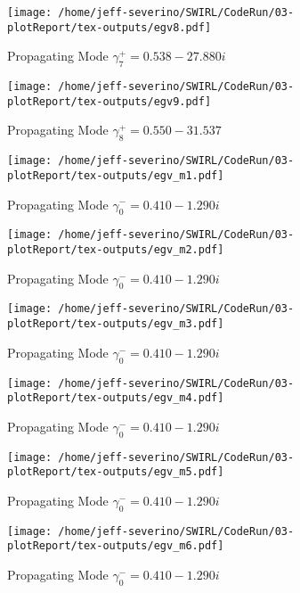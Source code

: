 \documentclass{article}
\begin{document}
 \begin{figure}
     \centering
     \texttt{[image: /home/jeff-severino/SWIRL/CodeRun/03-plotReport/tex-outputs/egv8.pdf]}
     \caption{Propagating Mode $\gamma^+_7 = 0.538 - 27.880i$}
 \end{figure}


 \begin{figure}
     \centering
     \texttt{[image: /home/jeff-severino/SWIRL/CodeRun/03-plotReport/tex-outputs/egv9.pdf]}
     \caption{Propagating Mode $\gamma^+_8 = 0.550 - 31.537$}
 \end{figure}




 \begin{figure}
     \centering
     \texttt{[image: /home/jeff-severino/SWIRL/CodeRun/03-plotReport/tex-outputs/egv\_m1.pdf]}
     \caption{Propagating Mode $\gamma^-_0 = 0.410-1.290i$}
 \end{figure}


 \begin{figure}
     \centering
     \texttt{[image: /home/jeff-severino/SWIRL/CodeRun/03-plotReport/tex-outputs/egv\_m2.pdf]}
     \caption{Propagating Mode $\gamma^-_0 = 0.410-1.290i$}
 \end{figure}


 \begin{figure}
     \centering
     \texttt{[image: /home/jeff-severino/SWIRL/CodeRun/03-plotReport/tex-outputs/egv\_m3.pdf]}
     \caption{Propagating Mode $\gamma^-_0 = 0.410-1.290i$}
 \end{figure}


 \begin{figure}
     \centering
     \texttt{[image: /home/jeff-severino/SWIRL/CodeRun/03-plotReport/tex-outputs/egv\_m4.pdf]}
     \caption{Propagating Mode $\gamma^-_0 = 0.410-1.290i$}
 \end{figure}


 \begin{figure}
     \centering
     \texttt{[image: /home/jeff-severino/SWIRL/CodeRun/03-plotReport/tex-outputs/egv\_m5.pdf]}
     \caption{Propagating Mode $\gamma^-_0 = 0.410-1.290i$}
 \end{figure}


 \begin{figure}
     \centering
     \texttt{[image: /home/jeff-severino/SWIRL/CodeRun/03-plotReport/tex-outputs/egv\_m6.pdf]}
     \caption{Propagating Mode $\gamma^-_0 = 0.410-1.290i$}
 \end{figure}
\end{document}

